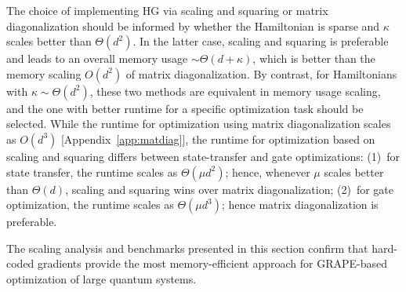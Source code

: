 The choice of implementing HG via scaling and squaring or matrix diagonalization should be informed by whether the Hamiltonian is sparse and $\kappa$ scales better than $\Theta(d^2)$. In the latter case, scaling and squaring is preferable and leads to an overall memory usage $\sim \Theta(d+\kappa)$, which is better than the memory scaling $O(d^2)$ of matrix diagonalization. By contrast, for Hamiltonians with $\kappa\sim \Theta(d^2)$, these two methods are equivalent in memory usage scaling, and the one with better runtime for a specific optimization task should be selected. While the runtime for optimization using matrix diagonalization scales as $O(d^3)$ [Appendix~\ref{app:matdiag}], the runtime for optimization based on scaling and squaring differs between state-transfer and gate optimizations: (1)~for state transfer, the runtime scales as $\Theta(\mu d^2)$; hence, whenever $\mu$ scales better than $\Theta(d)$, scaling and squaring wins over matrix diagonalization; (2)~for gate optimization, the runtime scales as $\Theta(\mu d^3)$; hence matrix diagonalization is preferable.

The scaling analysis and benchmarks presented in this section confirm that hard-coded gradients provide the most memory-efficient approach for GRAPE-based optimization of large quantum systems.
